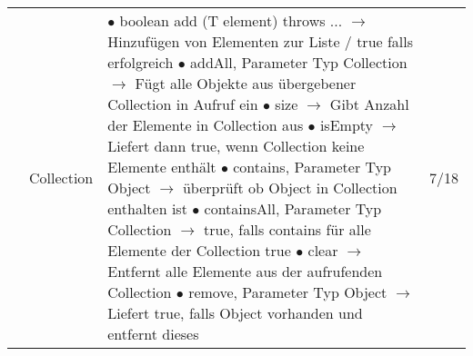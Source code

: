 \documentclass[11pt,a4paper]{article}
\begin{document}
\begin{center}
\begin{longtable}[h]{ | p{2.3cm} | p{2.3cm} | p{12.6cm} | p{1.2cm} | }
	& Collection & \makecell[l]{$\bullet$ boolean add (T element) throws ... \\
	\hspace{0.4cm} $\rightarrow$ Hinzufügen von Elementen zur Liste / true falls erfolgreich \\
	$\bullet$ addAll, Parameter Typ Collection \\
	\hspace{0.4cm} $\rightarrow$ Fügt alle Objekte aus übergebener Collection in Aufruf ein \\
	$\bullet$ size \\ 
	\hspace{0.4cm} $\rightarrow$ Gibt Anzahl der Elemente in Collection aus \\
	$\bullet$ isEmpty \\ 
	\hspace{0.4cm} $\rightarrow$ Liefert dann true, wenn Collection keine Elemente enthält \\
	$\bullet$ contains, Parameter Typ Object \\
	\hspace{0.4cm} $\rightarrow$ überprüft ob Object in Collection enthalten ist \\
	$\bullet$ containsAll, Parameter Typ Collection \\
	\hspace{0.4cm} $\rightarrow$ true, falls contains für alle Elemente der Collection true \\ 
	$\bullet$ clear \\
	\hspace{0.4cm} $\rightarrow$ Entfernt alle Elemente aus der aufrufenden Collection \\
	$\bullet$ remove, Parameter Typ Object \\ 
	\hspace{0.4cm} $\rightarrow$ Liefert true, falls Object vorhanden und entfernt dieses} & 7/18 \\ \cline{2-4}
	

\end{longtable}
\end{center}
\end{document}

